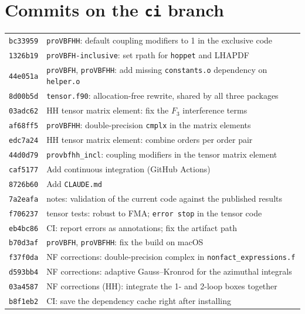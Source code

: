 \documentclass[11pt,a4paper]{article}
\newcommand{\provbfh}{\texttt{proVBFH}\xspace}
\newcommand{\provbfhh}{\texttt{proVBFHH}\xspace}
\newcommand{\provbfhinc}{\texttt{proVBFH-inclusive}\xspace}
\newcommand{\hoppet}{\texttt{hoppet}\xspace}
\newcommand{\commit}[1]{\texttt{#1}}
\newcommand{\file}[1]{\texttt{#1}}
\begin{document}
\appendix
\section{\texorpdfstring{Commits on the \texttt{ci} branch}{Commits on the ci branch}}
\label{app:commits}
{\small
\begin{tabular}{@{}ll@{}}
\commit{bc33959} & \provbfhh: default coupling modifiers to 1 in the exclusive code\\
\commit{1326b19} & \provbfhinc: set rpath for \hoppet and LHAPDF\\
\commit{44e051a} & \provbfh, \provbfhh: add missing \texttt{constants.o} dependency on \texttt{helper.o}\\
\commit{8d00b5d} & \file{tensor.f90}: allocation-free rewrite, shared by all three packages\\
\commit{03adc62} & HH tensor matrix element: fix the $F_3$ interference terms\\
\commit{af68ff5} & \provbfhh: double-precision \texttt{cmplx} in the matrix elements\\
\commit{edc7a24} & HH tensor matrix element: combine orders per order pair\\
\commit{44d0d79} & \texttt{provbfhh\_incl}: coupling modifiers in the tensor matrix element\\
\commit{caf5177} & Add continuous integration (GitHub Actions)\\
\commit{8726b60} & Add \file{CLAUDE.md}\\
\commit{7a2eafa} & notes: validation of the current code against the published results\\
\commit{f706237} & tensor tests: robust to FMA; \texttt{error stop} in the tensor code\\
\commit{eb4bc86} & CI: report errors as annotations; fix the artifact path\\
\commit{b70d3af} & \provbfh, \provbfhh: fix the build on macOS\\
\commit{f37f0da} & NF corrections: double-precision complex in \file{nonfact\_expressions.f}\\
\commit{d593bb4} & NF corrections: adaptive Gauss--Kronrod for the azimuthal integrals\\
\commit{03a4587} & NF corrections (HH): integrate the 1- and 2-loop boxes together\\
\commit{b8f1eb2} & CI: save the dependency cache right after installing\\

\end{tabular}}
\end{document}
